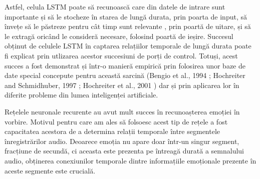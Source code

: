 \documentclass[a4paper,12pt]{book}
\begin{document}
				Astfel, celula LSTM poate să recunoască care din datele de intrare sunt importante și să le stocheze în starea de lungă durata, prin poarta de input, să învețe să le păstreze pentru cât timp sunt relevante , prin poartă de uitare, și să le extragă oricând le consideră necesare, folosind poartă de ieșire. Succesul obținut de celulele LSTM în captarea relațiilor temporale de lungă durata poate fi explicat prin utlizarea acestor succesiuni de porți de control. Totuși, acest succes a fost demonstrat și într-o manieră empirică prin folosirea unor baze de date special concepute pentru această sarcină (Bengio et al., 1994 \cite{rnn3}; Hochreiter and Schmidhuber, 1997 \cite{rnn4}; Hochreiter et al., 2001 \cite{rnn5}) dar și prin aplicarea lor în diferite probleme din lumea inteligenței artificiale. \par
				
				Rețelele neuronale recurente au avut mult succes în recunoașterea emoției în vorbire. Motivul pentru care am ales să folsoesc acest tip de rețele a fost capacitatea acestora de a determina relații temporale între segmentele înregistrărilor audio. Deoarece emoția nu apare doar într-un singur segment, fracțiune de secundă, ci aceasta este prezenta pe întreagă durată a semnalului audio, obținerea  conexiunilor temporale dintre informațiile emoționale prezente în aceste segmente este crucială. 
				
\end{document}
